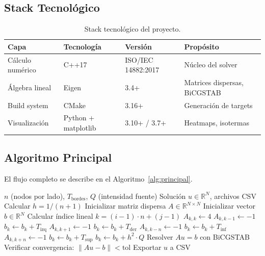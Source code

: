 \documentclass[12pt,a4paper]{article}
\theoremstyle{definition}
\newcommand{\norm}[1]{\|#1\|}
\newcommand{\R}{\mathbb{R}}
\begin{document}
\subsection{Stack Tecnol\'{o}gico}

\begin{table}[H]
\centering
\caption{Stack tecnol\'{o}gico del proyecto.}
\label{tab:stack}
\begin{tabular}{@{}llll@{}}
\toprule
\textbf{Capa} & \textbf{Tecnolog\'{i}a} & \textbf{Versi\'{o}n} & \textbf{Prop\'{o}sito} \\ \midrule
C\'{a}lculo num\'{e}rico & C++17 & ISO/IEC 14882:2017 & N\'{u}cleo del solver \\
\'{A}lgebra lineal & Eigen & 3.4+ & Matrices dispersas, BiCGSTAB \\
Build system & CMake & 3.16+ & Generaci\'{o}n de targets \\
Visualizaci\'{o}n & Python + matplotlib & 3.10+ / 3.7+ & Heatmaps, isotermas \\ \bottomrule
\end{tabular}
\end{table}

\subsection{Algoritmo Principal}

El flujo completo se describe en el Algoritmo~\ref{alg:principal}.

\begin{algorithm}[H]
\caption{Solver de Poisson 2D mediante Diferencias Finitas.}
\label{alg:principal}
\begin{algorithmic}[1]
\Require $n$ (nodos por lado), $T_{\text{bordes}}$, $Q$ (intensidad fuente)
\Ensure Soluci\'{o}n $u \in \R^N$, archivos CSV
\State Calcular $h = 1 / (n + 1)$
\State Inicializar matriz dispersa $A \in \R^{N \times N}$
\State Inicializar vector $b \in \R^N$
    \State Calcular \'{i}ndice lineal $k = (i-1) \cdot n + (j-1)$
    \State $A_{k,k} \leftarrow 4$ 
        \State $A_{k,k-1} \leftarrow -1$ 
    \Else
        \State $b_k \leftarrow b_k + T_{\text{izq}}$ 
    \EndIf
        \State $A_{k,k+1} \leftarrow -1$ 
    \Else
        \State $b_k \leftarrow b_k + T_{\text{der}}$ 
    \EndIf
        \State $A_{k,k-n} \leftarrow -1$ 
    \Else
        \State $b_k \leftarrow b_k + T_{\text{inf}}$ 
    \EndIf
        \State $A_{k,k+n} \leftarrow -1$ 
    \Else
        \State $b_k \leftarrow b_k + T_{\text{sup}}$ 
    \EndIf
        \State $b_k \leftarrow b_k + h^2 \cdot Q$ 
    \EndIf
\EndFor
\State Resolver $Au = b$ con BiCGSTAB
\State Verificar convergencia: $\norm{Au - b} < \text{tol}$
\State Exportar $u$ a CSV
\end{algorithmic}
\end{algorithm}
\end{document}
